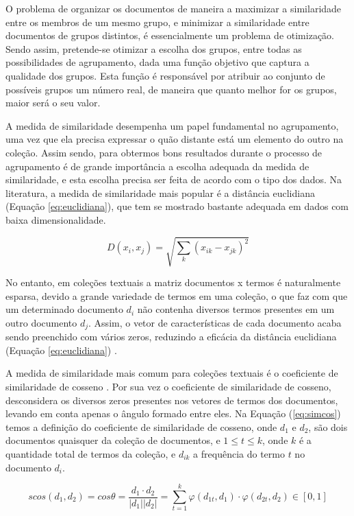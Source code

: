 O problema de organizar os documentos de maneira a maximizar a similaridade entre os membros de um
mesmo grupo, e minimizar a similaridade entre documentos de grupos distintos, é essencialmente um
problema de otimização.  Sendo assim, pretende-se otimizar a escolha dos grupos, entre
todas as possibilidades de agrupamento, dada uma função objetivo que captura a qualidade dos grupos.
Esta função é responsável por atribuir ao conjunto de possíveis grupos um número real, de maneira
que quanto melhor for os grupos, maior será o seu valor\cite{Feldman2007}.

A medida de similaridade desempenha um papel fundamental no agrupamento, uma vez que ela precisa
expressar o quão distante está um elemento do outro na coleção. Assim sendo, para obtermos bons
resultados durante o processo de agrupamento é de grande importância a escolha adequada da medida
de similaridade, e esta escolha precisa ser feita de acordo com o tipo dos dados.  Na literatura, a
medida de similaridade mais popular é a distância euclidiana (Equação
\ref{eq:euclidiana}), que tem se mostrado bastante adequada em dados com baixa dimensionalidade.

\begin{equation} 
  D(x_{i}, x_{j}) = \sqrt{\sum_k{(x_{ik}-x_{jk})^2}} 
  \label{eq:euclidiana}
\end{equation}

No entanto, em coleções textuais a matriz documentos x termos é naturalmente esparsa, devido a
grande variedade de termos em uma coleção, o que faz com que um determinado documento $d_{i}$ não
contenha diversos termos presentes em um outro documento $d_{j}$. Assim, o vetor de
características de cada documento acaba sendo preenchido com vários zeros, reduzindo a eficácia da
distância euclidiana (Equação \ref{eq:euclidiana}) \cite{Nogueira2013}. 

A medida de similaridade mais comum para coleções textuais é o coeficiente de similaridade de cosseno
\cite{Feldman2007}.  Por sua vez o coeficiente de similaridade de cosseno,
desconsidera os diversos zeros presentes nos vetores de termos dos documentos, levando em conta
apenas o ângulo formado entre eles\cite{Nogueira2013}.  Na Equação (\ref{eq:simcos}) temos a
definição do coeficiente de similaridade de cosseno, onde $d_1$ e $d_2$, são dois documentos
quaisquer da coleção de documentos, e $1 \leq t \leq k$, onde $k$ é a quantidade total de termos da
coleção, e $d_{ik}$ a frequência do termo $t$ no documento $d_i$.

\begin{equation} 
  scos(d_{1}, d_{2}) = cos\theta = \frac{d_{1} \cdot d_{2}}{|d_{1}||d_{2}|} =
  \sum_{t=1}^k{\varphi(d_{1t},d_1) \cdot \varphi(d_{2t},d_2)} \in [0,1] 
  \label{eq:simcos}
\end{equation}

